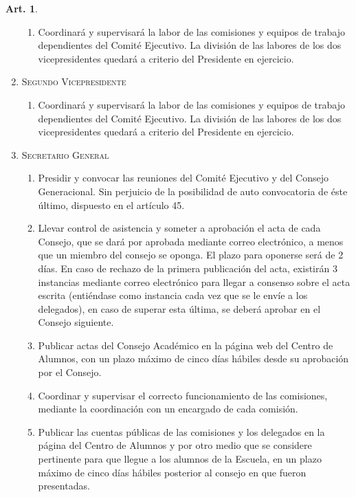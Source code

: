 \documentclass[letterpaper,11pt]{article}
\theoremstyle{definition}%
\newtheorem{art}{Art.} %
\begin{document}
\begin{art}
\begin{enumerate}
\begin{enumerate}
			      \item Coordinará y supervisará la labor de las comisiones y equipos de trabajo dependientes del Comité Ejecutivo. La división de las labores de los dos vicepresidentes quedará a criterio del Presidente en ejercicio.
		      \end{enumerate}

		\item \textsc{Segundo Vicepresidente}
		      \begin{enumerate}
			      \item Coordinará y supervisará la labor de las comisiones y equipos de trabajo dependientes del Comité Ejecutivo. La división de las labores de los dos vicepresidentes quedará a criterio del Presidente en ejercicio.
		      \end{enumerate}

		\item \textsc{Secretario General}
		      \begin{enumerate}
			      \item Presidir y convocar las reuniones del Comité Ejecutivo y del Consejo Generacional. Sin
			            perjuicio de la posibilidad de auto convocatoria de éste último, dispuesto en el artículo 45.

			      \item Llevar control de asistencia y someter a aprobación el acta de cada Consejo, que se dará por aprobada mediante correo electrónico, a menos que un miembro del consejo se oponga. El plazo para oponerse será de 2 días. En caso de rechazo de la primera publicación del acta,
			            existirán 3 instancias mediante correo electrónico para llegar a consenso sobre el acta escrita (entiéndase como instancia cada vez que se le envíe a los delegados), en caso de superar esta última, se deberá aprobar en el Consejo siguiente.

			      \item Publicar actas del Consejo Académico en la página web del Centro de Alumnos, con un plazo máximo de cinco días hábiles desde su aprobación por el Consejo.

			      \item Coordinar y supervisar el correcto funcionamiento de las comisiones, mediante la coordinación con un encargado de cada comisión.

			      \item Publicar las cuentas públicas de las comisiones y los delegados en la página del Centro de Alumnos y por otro medio que se considere pertinente para que llegue a los alumnos de la Escuela, en un plazo máximo de cinco días hábiles posterior al consejo en que fueron presentadas.
		      \end{enumerate}


\end{enumerate}
\end{art}
\end{document}
